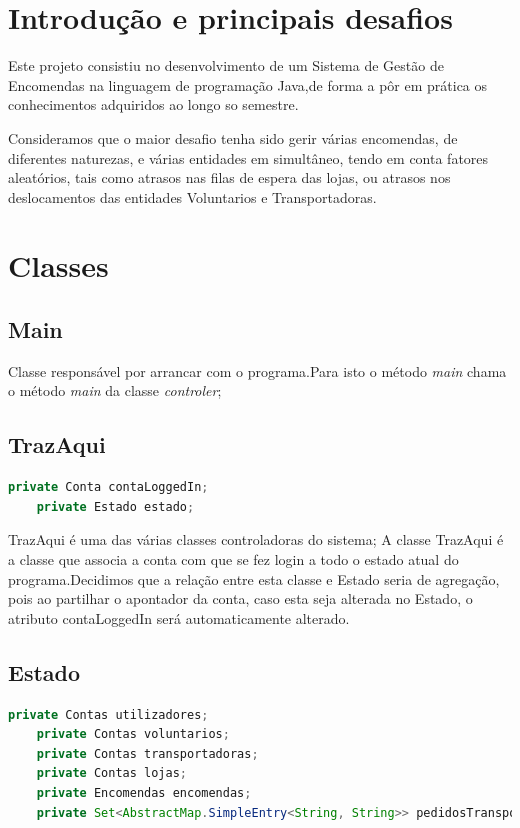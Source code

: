 \documentclass[a4paper]{report}
\begin{document}
	\tableofcontents
	
	\pagebreak
	
	\chapter{Introdução e principais desafios}
%	
	Este projeto consistiu no desenvolvimento de um Sistema de Gestão de Encomendas na linguagem de programação Java,de forma a pôr em prática os conhecimentos adquiridos ao longo so semestre. 
	
	Consideramos que o maior desafio tenha sido gerir várias encomendas, de diferentes naturezas, e várias entidades em simultâneo, tendo em conta fatores aleatórios, tais como atrasos nas filas de espera das lojas, ou atrasos nos deslocamentos das entidades Voluntarios e Transportadoras.
	
	\chapter{Classes}
	\section{Main}
	Classe responsável por arrancar com o programa.Para isto o método \textit{main} chama o método \textit{main} da classe \textit{controler};
	
	\section{TrazAqui}
	\begin{lstlisting}[language=Java]
	private Conta contaLoggedIn;
	private Estado estado;
	\end{lstlisting}
	TrazAqui é uma das várias classes controladoras do sistema;
	A classe TrazAqui é a classe que associa a conta com que se fez login a todo o estado atual do programa.Decidimos que a relação entre esta classe e Estado seria de agregação, pois ao partilhar o apontador da conta, caso esta seja alterada no Estado, o atributo contaLoggedIn será automaticamente alterado.
	\section{Estado}
	\begin{lstlisting}[language=Java]
	private Contas utilizadores;
	private Contas voluntarios;
	private Contas transportadoras;
	private Contas lojas;
	private Encomendas encomendas;
	private Set<AbstractMap.SimpleEntry<String, String>> pedidosTransporte; // -> (codEnc, Codt)
	\end{lstlisting}
	
\end{document}

